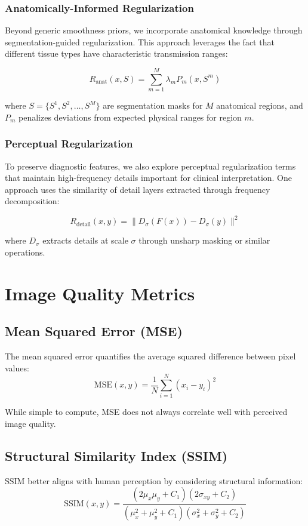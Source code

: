 \documentclass[nomenclature, english, bibtex]{kththesis}
\numberwithin{listing}{chapter}
\begin{document}
\subsubsection{Anatomically-Informed Regularization}
Beyond generic smoothness priors, we incorporate anatomical knowledge through segmentation-guided regularization. This approach leverages the fact that different tissue types have characteristic transmission ranges:

\begin{equation}
R_{\text{anat}}(x, S) = \sum_{m=1}^{M} \lambda_m P_m(x, S^m)
\end{equation}

where $S = \{S^1, S^2, \ldots, S^M\}$ are segmentation masks for $M$ anatomical regions, and $P_m$ penalizes deviations from expected physical ranges for region $m$.

\subsubsection{Perceptual Regularization}
To preserve diagnostic features, we also explore perceptual regularization terms that maintain high-frequency details important for clinical interpretation. One approach uses the similarity of detail layers extracted through frequency decomposition:

\begin{equation}
R_{\text{detail}}(x, y) = \|D_{\sigma}(F(x)) - D_{\sigma}(y)\|^2
\end{equation}

where $D_{\sigma}$ extracts details at scale $\sigma$ through unsharp masking or similar operations.


\section{Image Quality Metrics}
\subsection{Mean Squared Error (MSE)}
The mean squared error quantifies the average squared difference between pixel values:
\begin{equation}
\text{MSE}(x, y) = \frac{1}{N} \sum_{i=1}^N (x_i - y_i)^2
\end{equation}

While simple to compute, MSE does not always correlate well with perceived image quality.

\subsection{Structural Similarity Index (SSIM)}
SSIM \cite{wang2004image} better aligns with human perception by considering structural information:
\begin{equation}
\text{SSIM}(x, y) = \frac{(2\mu_x\mu_y + C_1)(2\sigma_{xy} + C_2)}{(\mu_x^2 + \mu_y^2 + C_1)(\sigma_x^2 + \sigma_y^2 + C_2)}
\end{equation}
\end{document}

